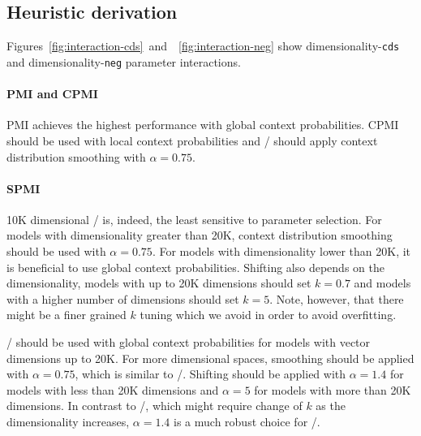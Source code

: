 \documentclass[11pt,letterpaper]{article}
\begin{document}




\subsection{Heuristic derivation}



Figures~\ref{fig:interaction-cds}~and~~\ref{fig:interaction-neg} show dimensionality-\texttt{cds} and dimensionality-\texttt{neg} parameter interactions.

\paragraph{PMI and CPMI}

PMI achieves the highest performance with global context probabilities. CPMI should be used with local context probabilities and \CPMI/ should apply context distribution smoothing with $\alpha = 0.75$.

\paragraph{SPMI}

10K dimensional \SPMI/ is, indeed, the least sensitive to parameter selection. For models with dimensionality greater than 20K, context distribution smoothing should be used with $\alpha = 0.75$. For models with dimensionality lower than 20K, it is beneficial to use global context probabilities. Shifting also depends on the dimensionality, models with up to 20K dimensions should set $k = 0.7$ and models with a higher number of dimensions should set $k = 5$. Note, however, that there might be a finer grained $k$ tuning which we avoid in order to avoid overfitting.

\logNSPMI/ should be used with global context probabilities for models with vector dimensions up to 20K. For more dimensional spaces, smoothing should be applied with $\alpha = 0.75$, which is similar to \SPMI/. Shifting should be applied with $\alpha = 1.4$ for models with less than 20K dimensions and $\alpha = 5$ for models with more than 20K dimensions. In contrast to \SPMI/, which might require change of $k$ as the dimensionality increases, $\alpha = 1.4$ is a much robust choice for \logNSPMI/.
\end{document}
